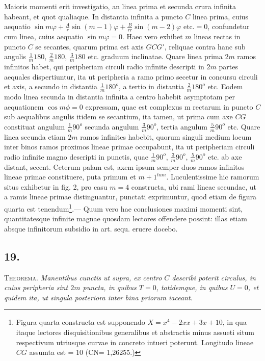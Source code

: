 \documentclass[14pt]{memoir}
\theoremstyle{plain}
\theoremstyle{remark}
\begin{document}
Maioris momenti erit investigatio, an linea prima et secunda crura infinita habeant, et quot qualiaque. In distantia infinita a puncto \(C\) linea prima, cuius aequatio \(\sin m \varphi + \frac{A}{r} \sin (m-1)\varphi + \frac{B}{rr} \sin (m-2) \varphi \text{ etc.} = 0\), confundetur cum linea, cuius aequatio \(\sin m \varphi = 0\). Haec vero exhibet \(m\) lineas rectas in puncto \(C\) se secantes, quarum prima est axis \(GCG'\), reliquae contra hanc sub angulis \(\frac{1}{m} 180\), \(\frac{2}{m} 180\), \(\frac{3}{m} 180 \) etc. graduum inclinatae.  Quare linea prima \(2m\) ramos infinitos habet, qui peripheriam circuli radio infinite descripti in \(2m\) partes aequales dispertiuntur, ita ut peripheria a ramo primo secetur in concursu circuli et axis, a secundo in distantia \(\frac{1}{m} 180^o\), a tertio in distantia \(\frac{2}{m} 180^o\) etc.  Eodem modo linea secunda in distantia infinita a centro habebit asymptotam per aequationem \(\cos m \phi = 0\) expressam, quae est complexus m rectarum in puncto \(C\) sub aequalibus angulis itidem se secantium, ita tamen, ut prima cum axe \(CG\) constituat angulum \(\frac{1}{m}90^o\) secunda angulum \(\frac{3}{m}90^o\), tertia angulum \(\frac{5}{m}90^o\) etc. Quare linea secunda etiam \(2m\) ramos infinites habebit, quorum singuli medium locum inter binos ramos proximos lineae primae occupabunt, ita ut peripheriam circuli radio infinite magno descripti in punctis, quae \(\frac{1}{m}90^o\), \(\frac{3}{m}90^o\), \(\frac{5}{m}90^o\) etc. ab axe distant, secent. Ceterum palam est, axem ipsum semper duos ramos infinitos lineae primae constituere, puta primum et \({m+1}^{tum}\). Luculentissime hic ramorum situs exhibetur in fig. 2, pro casu \(m = 4\) constructa, ubi rami lineae secundae, ut a ramis lineae primae distinguantur, punctati exprimuntur, quod etiam de figura quarta est tenendum\footnote{Figura quarta constructa est supponendo \(X = x^4 - 2xx + 3x + 10\), in qua itaque lectores disquisitionibus generalibus et abstractis minus assueti situm respectivum utriusque curvae in concreto intueri poterunt.   Longitudo lineae \(CG\) assumta est  = 10  (CN= 1,26255.)}.—  Quum vero hae conclusiones maximi momenti sint, quantitatesque infinite magnae quosdam lectores offendere possint: illas etiam absque infinitorum subsidio in art. sequ. eruere docebo.

\subsection*{19.}

\textsc{Theorema}.  \textit{Manentibus cunctis ut supra, ex centro \(C\) describi poterit circulus, in cuius peripheria sint \(2m\) puncta, in quibus \(T= 0\), totidemque, in quibus \(U=0\), et quidem ita, ut singula posteriora inter bina priorum iaceant.}
\end{document}
